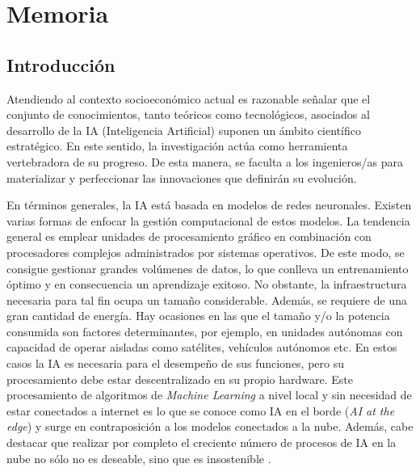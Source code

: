 
\chapter{Memoria} %

\label{Memoria} %

\section{Introducción}

Atendiendo al contexto socioeconómico actual es razonable señalar que el conjunto de conocimientos, tanto teóricos como tecnológicos, asociados al desarrollo de la IA (Inteligencia Artificial) suponen un ámbito científico estratégico. 
En este sentido, la investigación actúa como herramienta vertebradora de su progreso. 
De esta manera, se faculta a los ingenieros/as para materializar y perfeccionar las innovaciones que definirán su evolución. 

En términos generales, la IA está basada en modelos de redes neuronales.
Existen varias formas de enfocar la gestión computacional de estos modelos.
La tendencia general es emplear unidades de procesamiento gráfico en combinación con procesadores complejos administrados por sistemas operativos. 
De este modo, se consigue gestionar grandes volúmenes de datos, lo que conlleva un entrenamiento óptimo y en consecuencia un aprendizaje exitoso.
No obstante, la infraestructura necesaria para tal fin ocupa un tamaño considerable.
Además, se requiere de una gran cantidad de energía.
Hay ocasiones en las que el tamaño y/o la potencia consumida son factores determinantes, por ejemplo, en unidades autónomas con capacidad de operar aisladas como satélites, vehículos autónomos etc.
En estos casos la IA es necesaria para el desempeño de sus funciones, pero su procesamiento debe estar descentralizado en su propio hardware.
Este procesamiento de algoritmos de \textit{Machine Learning} a nivel local y sin necesidad de estar conectados a internet es lo que se conoce como IA en el borde \cite{IA-edge} (\textit{AI at the edge}) y surge en contraposición a los modelos conectados a la nube.
Además, cabe destacar que realizar por completo el creciente número de procesos de IA en la nube no sólo no es deseable, sino que es insostenible \cite{Efficient-Inference}. 

